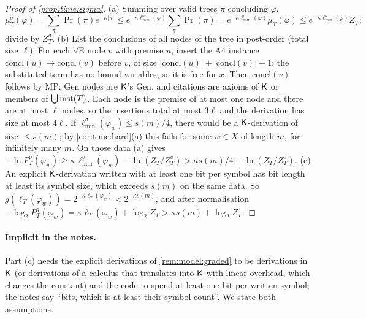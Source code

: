 \begin{proof}[Proof of \cref{prop:time:sigma}]
(a) Summing over valid trees $\pi$ concluding $\varphi$,
\[
\mu^\sigma_T(\varphi)=\sum_{\pi}\Pr(\pi)e^{-\kappa|\pi|}\le e^{-\kappa\ell^\sigma_{\min}(\varphi)}\sum_{\pi}\Pr(\pi)=e^{-\kappa\ell^\sigma_{\min}(\varphi)}\mu_T(\varphi)\le e^{-\kappa\ell^\sigma_{\min}(\varphi)}Z_T;
\]
divide by $Z^\sigma_T$.
(b) List the conclusions of all nodes of the tree in post-order (total size $\ell$). For each $\forall$E node $v$ with premise $u$, insert the A4 instance $\mathrm{concl}(u)\to\mathrm{concl}(v)$ before $v$, of size $|\mathrm{concl}(u)|+|\mathrm{concl}(v)|+1$; the substituted term has no bound variables, so it is free for $x$. Then $\mathrm{concl}(v)$ follows by MP; Gen nodes are $\mathsf{K}$'s Gen, and citations are axioms of $\mathsf{K}$ or members of $\bigcup\mathrm{inst}(T)$. Each node is the premise of at most one node and there are at most $\ell$ nodes, so the insertions total at most $3\ell$ and the derivation has size at most $4\ell$. If $\ell^\sigma_{\min}(\varphi_w)\le s(m)/4$, there would be a $\mathsf{K}$-derivation of size $\le s(m)$; by \cref{cor:time:hard}(a) this fails for some $w\in X$ of length $m$, for infinitely many $m$. On those data (a) gives $-\ln P^\sigma_T(\varphi_w)\ge\kappa\,\ell^\sigma_{\min}(\varphi_w)-\ln(Z_T/Z^\sigma_T)>\kappa s(m)/4-\ln(Z_T/Z^\sigma_T)$.
(c) An explicit $\mathsf{K}$-derivation written with at least one bit per symbol has bit length at least its symbol size, which exceeds $s(m)$ on the same data. So $g(\ell_T(\varphi_w))=2^{-\kappa\ell_T(\varphi_w)}<2^{-\kappa s(m)}$, and after normalisation $-\log_2P^g_T(\varphi_w)=\kappa\ell_T(\varphi_w)+\log_2Z_T>\kappa s(m)+\log_2Z_T$.
\end{proof}

\paragraph{Implicit in the notes.} Part (c) needs the explicit derivations of \cref{rem:model:graded} to be derivations in $\mathsf{K}$ (or derivations of a calculus that translates into $\mathsf{K}$ with linear overhead, which changes the constant) and the code to spend at least one bit per written symbol; the notes say ``bits, which is at least their symbol count''. We state both assumptions.

